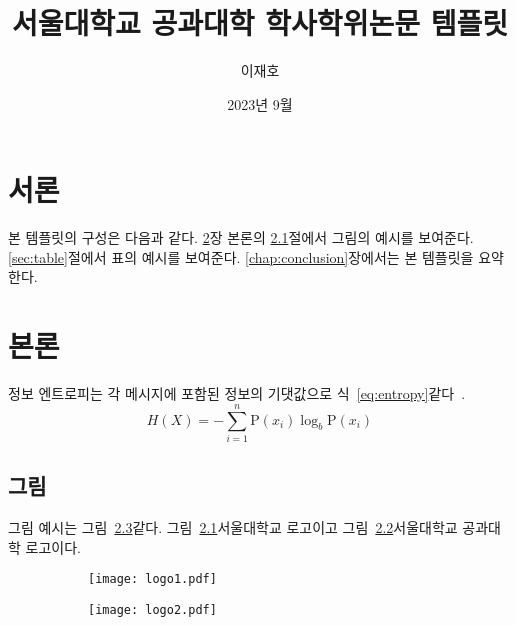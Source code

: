 \documentclass[ko]{snu-ece-bsc-thesis}
\title{서울대학교 공과대학 학사학위논문 템플릿}
\author{이재호}
\date{2023년 9월}
\begin{document}
\maketitle

\begin{abstract}
  \jiwon[1]
\end{abstract}

\tableofcontents
\listoftables
\listoffigures

\chapter{서론}\label{chap:introduction}
본 템플릿의 구성은 다음과 같다.
\ref{chap:body}장 본론의 \ref{sec:picture}절에서 그림의 예시를 보여준다.
\ref{sec:table}절에서 표의 예시를 보여준다.
\ref{chap:conclusion}장에서는 본 템플릿을 요약한다.

\jiwon[2-3]


\chapter{본론}\label{chap:body}
정보 엔트로피는 각 메시지에 포함된 정보의 기댓값으로 식~\eqref{eq:entropy}\와 같다~\cite{6773024}.
\begin{equation}\label{eq:entropy}
  H(X) = -\sum_{i=1}^n {\mathrm{P}(x_i) \log_b \mathrm{P}(x_i)}
\end{equation}

\jiwon[4-6]


\section{그림}\label{sec:picture}
그림 예시는 그림~\ref{fig:example}\와 같다. 그림~\ref{fig:snu}\은 서울대학교 로고이고 그림~\ref{fig:eng}\는 서울대학교 공과대학 로고이다.

\begin{figure}[htp]
  \centering
  \begin{subfigure}[b]{0.5\textwidth}
    \centering
    \texttt{[image: logo1.pdf]}
    \label{fig:snu}
  \end{subfigure}%
  \begin{subfigure}[b]{0.5\textwidth}
    \centering
    \texttt{[image: logo2.pdf]}
    \label{fig:eng}
  \end{subfigure}
  \label{fig:example}
\end{figure}
\end{document}

